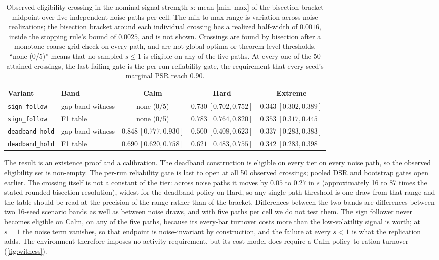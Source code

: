 \begin{table}[t]
\centering
\caption{Observed eligibility crossing in the nominal signal strength $s$: mean [min, max] of the bisection-bracket midpoint over five independent noise paths per cell. The min to max range is variation across noise realizations; the bisection bracket around each individual crossing has a realized half-width of $0.0016$, inside the stopping rule's bound of $0.0025$, and is not shown. Crossings are found by bisection after a monotone coarse-grid check on every path, and are not global optima or theorem-level thresholds. ``none (0/5)'' means that no sampled $s\le1$ is eligible on any of the five paths. At every one of the 50 attained crossings, the last failing gate is the per-run reliability gate, the requirement that every seed's marginal PSR reach $0.90$.}
\label{tab:witness}
\small
\setlength{\tabcolsep}{3.5pt}
\begin{tabular}{llccc}
\toprule
Variant & Band & Calm & Hard & Extreme \\
\midrule
\texttt{sign\_follow} & gap-band witness & none (0/5) & $0.730\ [0.702,0.752]$ & $0.343\ [0.302,0.389]$ \\
\texttt{sign\_follow} & F1 table & none (0/5) & $0.783\ [0.764,0.820]$ & $0.353\ [0.317,0.445]$ \\
\texttt{deadband\_hold} & gap-band witness & $0.848\ [0.777,0.930]$ & $0.500\ [0.408,0.623]$ & $0.337\ [0.283,0.383]$ \\
\texttt{deadband\_hold} & F1 table & $0.690\ [0.620,0.758]$ & $0.621\ [0.483,0.755]$ & $0.342\ [0.283,0.398]$ \\
\bottomrule
\end{tabular}
\end{table}

The result is an existence proof and a calibration. The deadband construction is eligible on every tier on every noise path, so the observed eligibility set is non-empty. The per-run reliability gate is last to open at all 50 observed crossings; pooled DSR and bootstrap gates open earlier. The crossing itself is not a constant of the tier: across noise paths it moves by $0.05$ to $0.27$ in $s$ (approximately 16 to 87 times the stated rounded bisection resolution), widest for the deadband policy on Hard, so any single-path threshold is one draw from that range and the table should be read at the precision of the range rather than of the bracket. Differences between the two bands are differences between two 16-seed scenario bands as well as between noise draws, and with five paths per cell we do not test them. The sign follower never becomes eligible on Calm, on any of the five paths, because its every-bar turnover costs more than the low-volatility signal is worth; at $s=1$ the noise term vanishes, so that endpoint is noise-invariant by construction, and the failure at every $s<1$ is what the replication adds. The environment therefore imposes no activity requirement, but its cost model does require a Calm policy to ration turnover (\cref{fig:witness}).

